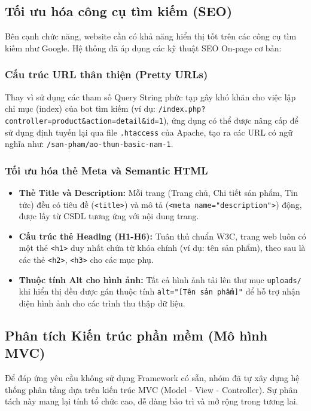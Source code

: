 \subsection{Tối ưu hóa công cụ tìm kiếm (SEO)}
Bên cạnh chức năng, website cần có khả năng hiển thị tốt trên các công cụ tìm kiếm như Google. Hệ thống đã áp dụng các kỹ thuật SEO On-page cơ bản:

\subsubsection{Cấu trúc URL thân thiện (Pretty URLs)}
Thay vì sử dụng các tham số Query String phức tạp gây khó khăn cho việc lập chỉ mục (index) của bot tìm kiếm (ví dụ: \texttt{/index.php?controller=product\&action=detail\&id=1}), ứng dụng có thể được nâng cấp để sử dụng định tuyến lại qua file \texttt{.htaccess} của Apache, tạo ra các URL có ngữ nghĩa như: \texttt{/san-pham/ao-thun-basic-nam-1}.

\subsubsection{Tối ưu hóa thẻ Meta và Semantic HTML}
\begin{itemize}
    \item \textbf{Thẻ Title và Description:} Mỗi trang (Trang chủ, Chi tiết sản phẩm, Tin tức) đều có tiêu đề (\texttt{<title>}) và mô tả (\texttt{<meta name="description">}) động, được lấy từ CSDL tương ứng với nội dung trang.
    \item \textbf{Cấu trúc thẻ Heading (H1-H6):} Tuân thủ chuẩn W3C, trang web luôn có một thẻ \texttt{<h1>} duy nhất chứa từ khóa chính (ví dụ: tên sản phẩm), theo sau là các thẻ \texttt{<h2>}, \texttt{<h3>} cho các mục phụ.
    \item \textbf{Thuộc tính Alt cho hình ảnh:} Tất cả hình ảnh tải lên thư mục \texttt{uploads/} khi hiển thị đều được gán thuộc tính \texttt{alt="[Tên sản phẩm]"} để hỗ trợ nhận diện hình ảnh cho các trình thu thập dữ liệu.
\end{itemize}

\subsection{Phân tích Kiến trúc phần mềm (Mô hình MVC)}
Để đáp ứng yêu cầu không sử dụng Framework có sẵn, nhóm đã tự xây dựng hệ thống phân tầng dựa trên kiến trúc MVC (Model - View - Controller). Sự phân tách này mang lại tính tổ chức cao, dễ dàng bảo trì và mở rộng trong tương lai.

